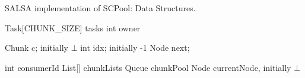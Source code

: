 \begin{algo}[!ht]
\caption{SALSA implementation of SCPool: Data Structures.} 
\label{alg:non-fifo-ds}
\scriptsize
\begin{minipage}[t]{0.48\textwidth}
\begin{distribalgo}[1]
\smallskip

	\STATE Task[CHUNK\_SIZE] tasks 
  \STATE int owner 
\ENDINDENT

  \STATE Chunk c; initially $\bot$
  \STATE int idx; initially -1
  \STATE Node next; 
\ENDINDENT

\setcounter{alg:non-fifo:lines}{\value{ALC@line}} %
\end{distribalgo}
\end{minipage}%
%
\hfill
%
\begin{minipage}[t]{0.48\textwidth}
%
\begin{distribalgo}[1]
\setcounter{ALC@line}{\value{alg:non-fifo:lines}}
\smallskip

  \STATE int consumerId
  \STATE List[] chunkLists  
  \STATE Queue chunkPool 
  \STATE Node currentNode, initially $\bot$  
\ENDINDENT

\setcounter{alg:non-fifo:lines}{\value{ALC@line}}
\end{distribalgo}
\end{minipage}
\end{algo}


